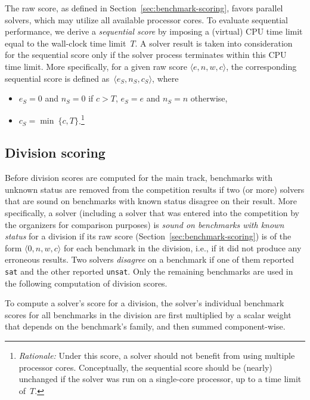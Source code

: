 \documentclass[12pt]{article}
\begin{document}
The raw score, as defined in Section~\ref{sec:benchmark-scoring},
favors parallel solvers, which may utilize all available processor
cores.  To evaluate sequential performance, we derive a
\emph{sequential score} by imposing a (virtual) CPU time limit equal
to the wall-clock time limit~$T$.  A solver result is taken into
consideration for the sequential score only if the solver process
terminates within this CPU time limit.  More specifically, for a given
raw score $\langle e, n, w, c\rangle$, the corresponding sequential
score is defined as~$\langle e_S, n_S, c_S\rangle$, where
\begin{itemize}
\item $e_S = 0$ and $n_S = 0$ if $c > T$, $e_S = e$ and $n_S = n$
  otherwise,
\item $c_S = \min\ \{c, T\}$.\footnote{\emph{Rationale:} Under this
  score, a solver should not benefit from using multiple processor
  cores.  Conceptually, the sequential score should be (nearly)
  unchanged if the solver was run on a single-core processor, up to a
  time limit of~$T$.}
\end{itemize}

\subsection{Division scoring}
\label{sec:division-scoring}

%
Before division scores are computed for the main track, benchmarks
with unknown status are removed from the competition results if two
(or more) solvers that are sound on benchmarks with known status
disagree on their result.  More specifically, a solver (including a
solver that was entered into the competition by the organizers for
comparison purposes) is \emph{sound on benchmarks with known status}
for a division if its raw score (Section~\ref{sec:benchmark-scoring})
is of the form $\langle 0, n, w, c\rangle$ for each benchmark in the
division, i.e., if it did not produce any erroneous results.  Two
solvers \emph{disagree} on a benchmark if one of them reported
\texttt{sat} and the other reported \texttt{unsat}.  Only the
remaining benchmarks are used in the following computation of division
scores.

\medskip

To compute a solver's score for a division, the solver's individual
benchmark scores for all benchmarks in the division are first
multiplied by a scalar weight that depends on the benchmark's family,
and then summed component-wise.
\end{document}
